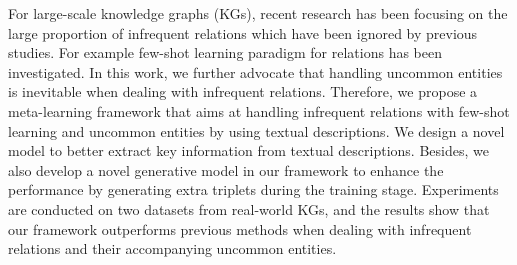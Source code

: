For large-scale knowledge graphs (KGs), recent research has been focusing on the large proportion of infrequent relations which have been ignored by previous studies.
For example few-shot learning paradigm for relations has been investigated.
In this work, we further advocate that handling uncommon entities is inevitable when dealing with infrequent relations.
Therefore, we propose a meta-learning framework that aims at handling infrequent relations with few-shot learning and uncommon entities by using textual descriptions.
We design a novel model to better extract key information from textual descriptions.
Besides, we also develop a novel generative model in our framework to enhance the performance by generating extra triplets during the training stage.
Experiments are conducted on two datasets from real-world KGs, and the results show that our framework outperforms previous methods when dealing with infrequent relations and their accompanying uncommon entities.